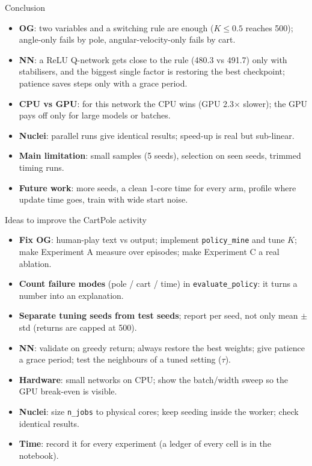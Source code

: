 \documentclass[aspectratio=169]{beamer}
\begin{document}
\begin{frame}{Conclusion}
\begin{itemize}
  \item \textbf{OG}: two variables and a switching rule are enough ($K\le0.5$ reaches 500); angle-only fails by pole, angular-velocity-only fails by cart.
  \item \textbf{NN}: a ReLU Q-network gets close to the rule (480.3 vs 491.7) only with stabilisers, and the biggest single factor is \alert{restoring the best checkpoint}; patience saves steps only with a grace period.
  \item \textbf{CPU vs GPU}: for this network the CPU wins (GPU 2.3$\times$ slower); the GPU pays off only for large models or batches.
  \item \textbf{Nuclei}: parallel runs give identical results; speed-up is real but sub-linear.
  \item \textbf{Main limitation}: small samples (5 seeds), selection on seen seeds, trimmed timing runs.
  \item \textbf{Future work}: more seeds, a clean 1-core time for every arm, profile where update time goes, train with wide start noise.
\end{itemize}
\end{frame}

\begin{frame}{Ideas to improve the CartPole activity}
\small
\begin{itemize}
  \item \textbf{Fix OG}: human-play text vs output; implement \texttt{policy\_mine} and tune $K$; make Experiment A measure over episodes; make Experiment C a real ablation.
  \item \textbf{Count failure modes} (pole / cart / time) in \texttt{evaluate\_policy}: it turns a number into an explanation.
  \item \textbf{Separate tuning seeds from test seeds}; report per seed, not only mean $\pm$ std (returns are capped at 500).
  \item \textbf{NN}: validate on greedy return; always restore the best weights; give patience a grace period; test the neighbours of a tuned setting ($\tau$).
  \item \textbf{Hardware}: small networks on CPU; show the batch/width sweep so the GPU break-even is visible.
  \item \textbf{Nuclei}: size \texttt{n\_jobs} to physical cores; keep seeding inside the worker; check identical results.
  \item \textbf{Time}: record it for every experiment (a ledger of every cell is in the notebook).
\end{itemize}
\end{frame}
\end{document}
